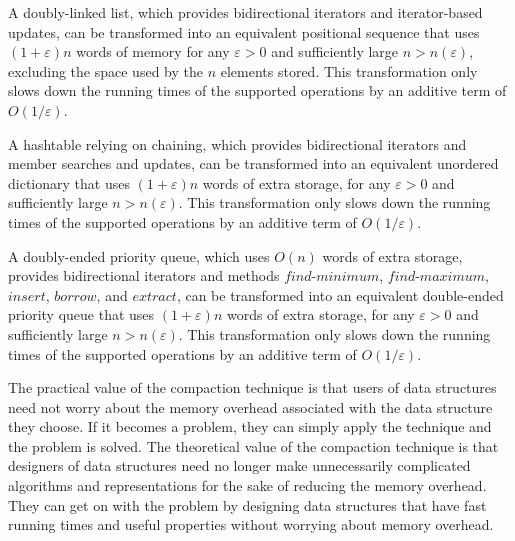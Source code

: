 \documentclass{DIKU-article}
\newcommand{\Findmin}{\mbox{$\mathit{find}$\textnormal{-}}\allowbreak{}\mbox{$\mathit{minimum}$}}
\newcommand{\Findmax}{\mbox{$\mathit{find}$\textnormal{-}}\allowbreak{}\mbox{$\mathit{maximum}$}}
\newcommand{\Insert}{\mbox{$\mathit{insert}$}}
\newcommand{\Extract}{\mbox{$\mathit{extract}$}}
\newcommand{\Borrow}{\mbox{$\mathit{borrow}$}}
\begin{document}
\begin{theorem}
A doubly-linked list, which provides bidirectional iterators and
iterator-based updates, can be transformed into an equivalent
positional sequence that uses $(1 + \varepsilon)n$ words of memory for
any $\varepsilon > 0$ and sufficiently large $n > n(\varepsilon)$,
excluding the space used by the $n$ elements stored. This
transformation only slows down the running times of the supported
operations by an additive term of $O(1/\varepsilon)$.
\end{theorem}

\begin{theorem}
A hashtable relying on chaining, which provides bidirectional
iterators and member searches and updates, can be transformed into an
equivalent unordered dictionary that uses $(1 + \varepsilon)n$ words
of extra storage, for any $\varepsilon > 0$ and sufficiently large $n
> n(\varepsilon)$.  This transformation only slows down the running
times of the supported operations by an additive term of
$O(1/\varepsilon)$.
\end{theorem}

\begin{theorem}
A doubly-ended priority queue, which uses $O(n)$ words of extra
storage, provides bidirectional iterators and methods \Findmin{},
\Findmax{}, \Insert{}, \Borrow{}, and \Extract{}, can be transformed
into an equivalent double-ended priority queue that uses $(1 +
\varepsilon)n$ words of extra storage, for any $\varepsilon > 0$ and
sufficiently large $n > n(\varepsilon)$.  This transformation only
slows down the running times of the supported operations by an
additive term of $O(1/\varepsilon)$.
\end{theorem}

The practical value of the compaction technique is that users of data
structures need not worry about the memory overhead associated with
the data structure they choose.  If it becomes a problem, they can
simply apply the technique and the problem is solved.  The theoretical
value of the compaction technique is that designers of data structures
need no longer make unnecessarily complicated algorithms and
representations for the sake of reducing the memory overhead.  They
can get on with the problem by designing data structures that have
fast running times and useful properties without worrying about
memory overhead.




\end{document}
